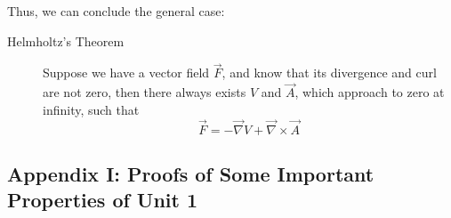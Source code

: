 \documentclass[12pt,a4paper,twoside]{article}
\begin{document}
	\noindent Thus, we can conclude the general case:
	\begin{description}
	    \item [Helmholtz's Theorem] Suppose we have a vector field $\overrightarrow{F}$, and know that its divergence and curl are not zero, then there always exists $V$ and $\overrightarrow{A}$, which approach to zero at infinity, such that
	    \begin{equation}
	        \overrightarrow{F}=-\overrightarrow{\nabla}V+\overrightarrow{\nabla}\times\overrightarrow{A}
	    \end{equation}
	\end{description}
	\newpage
	
	
	\subsection{Appendix I: Proofs of Some Important Properties of Unit 1}
\end{document}
